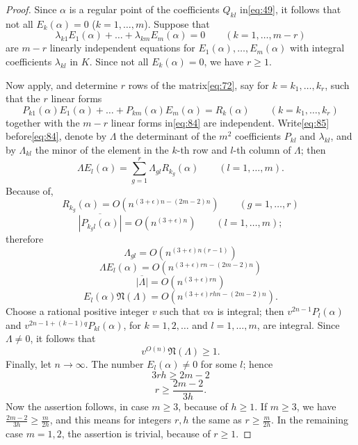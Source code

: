 \begin{proof}
Since $\alpha$ is a regular point of the coefficients $Q_{kl}$ in\eqref{eq:49}, it follows that not all $E_k(\alpha)=0$ ($k=1,\dots,m$). Suppose that
\begin{equation}
\lambda_{k1} E_1(\alpha) + \dots + \lambda_{km} E_m(\alpha) = 0 \qquad (k=1,\dots,m-r) \tag{84}\label{eq:84}
\end{equation}
are $m-r$ linearly independent equations for $E_1(\alpha), \dots, E_m(\alpha)$ with integral coefficients $\lambda_{kl}$ in $K$. Since not all $E_k(\alpha)=0$, we have $r \ge 1$.

Now apply, and determine $r$ rows of the matrix\eqref{eq:72}, say for $k=k_1,\dots,k_r$, such that the $r$ linear forms
\begin{equation}
P_{k1}(\alpha) E_1(\alpha) + \dots + P_{km}(\alpha) E_m(\alpha) = R_k(\alpha) \qquad (k=k_1,\dots,k_r) \tag{85}\label{eq:85}
\end{equation}
together with the $m-r$ linear forms in\eqref{eq:84} are independent. Write\eqref{eq:85} before\eqref{eq:84}, denote by $\Lambda$ the determinant of the $m^2$ coefficients $P_{kl}$ and $\lambda_{kl}$, and by $\Lambda_{kl}$ the minor of the element in the $k$-th row and $l$-th column of $\Lambda$; then
\[\Lambda E_{l}(\alpha) = \sum_{g=1}^{r} \Lambda_{gl} R_{k_{g}}(\alpha) \qquad (l=1,\dots,m).\]
Because of,
\[R_{k_{g}}(\alpha) = O(n^{(3+\epsilon)n-(2m-2)n}) \qquad (g=1,\dots,r)\]
\[\overline{|P_{k_g l}(\alpha)|} = O(n^{(3+\epsilon)n}) \qquad (l=1,\dots,m);\]
therefore
\[\Lambda_{gl} = O \left( n^{(3+\epsilon)n(r-1)} \right)\]
\[\Lambda E_{l}(\alpha) = O \left( n^{(3+\epsilon)rn-(2m-2)n} \right)\]
\[\overline{|\Lambda|} = O \left( n^{(3+\epsilon)rn} \right)\]
\[E_{l}(\alpha) \mathfrak{N}(\Lambda) = O \left( n^{(3+\epsilon)rhn-(2m-2)n} \right).\]
Choose a rational positive integer $v$ such that $v \alpha$ is integral; then $v^{2n-1} P_l(\alpha)$ and $v^{2n-1+(k-1)q} P_{kl}(\alpha)$, for $k=1, 2, \dots$ and $l=1, \dots, m$, are integral. Since $\Lambda \neq 0$, it follows that
\[v^{O(n)} \mathfrak{N}(\Lambda) \ge 1.\]
Finally, let $n \to \infty$. The number $E_l(\alpha) \neq 0$ for some $l$; hence
\[3rh \ge 2m-2\]
\[r \ge \frac{2m-2}{3h}.\]
Now the assertion follows, in case $m \ge 3$, because of $h \ge 1$. If $m \ge 3$, we have $\frac{2m-2}{3h} \ge \frac{m}{2h}$, and this means for integers $r, h$ the same as $r \ge \frac{m}{2h}$. In the remaining case $m=1, 2$, the assertion is trivial, because of $r \ge 1$.
\end{proof}

